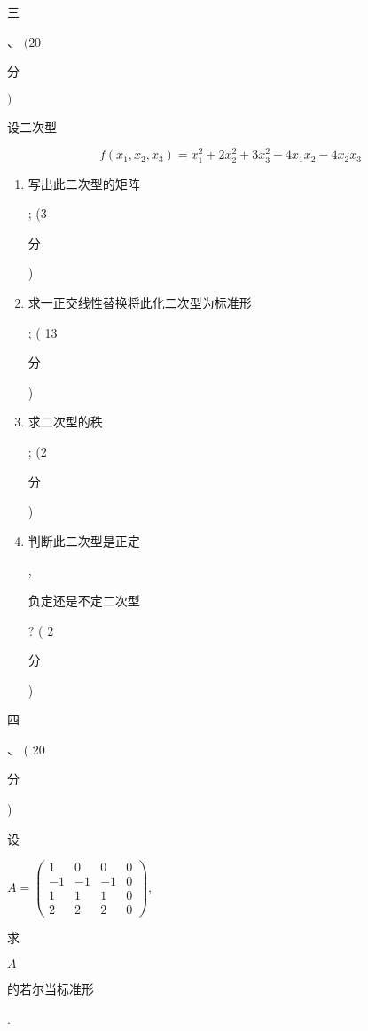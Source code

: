 \documentclass[10pt]{article}
\begin{document}
\begin{CJK}{UTF8}{mj}三\end{CJK}、 $(20$ \begin{CJK}{UTF8}{mj}分\end{CJK} $)$ \begin{CJK}{UTF8}{mj}设二次型\end{CJK}
$$
f\left(x_{1}, x_{2}, x_{3}\right)=x_{1}^{2}+2 x_{2}^{2}+3 x_{3}^{2}-4 x_{1} x_{2}-4 x_{2} x_{3}
$$

\begin{enumerate}
  \item \begin{CJK}{UTF8}{mj}写出此二次型的矩阵\end{CJK}; (3 \begin{CJK}{UTF8}{mj}分\end{CJK})

  \item \begin{CJK}{UTF8}{mj}求一正交线性替换将此化二次型为标准形\end{CJK}; ( 13 \begin{CJK}{UTF8}{mj}分\end{CJK})

  \item \begin{CJK}{UTF8}{mj}求二次型的秩\end{CJK}; (2 \begin{CJK}{UTF8}{mj}分\end{CJK})

  \item \begin{CJK}{UTF8}{mj}判断此二次型是正定\end{CJK}, \begin{CJK}{UTF8}{mj}负定还是不定二次型\end{CJK}? ( 2 \begin{CJK}{UTF8}{mj}分\end{CJK})

\end{enumerate}
\begin{CJK}{UTF8}{mj}四\end{CJK}、 ( 20 \begin{CJK}{UTF8}{mj}分\end{CJK}) \begin{CJK}{UTF8}{mj}设\end{CJK} $A=\left(\begin{array}{cccc}1 & 0 & 0 & 0 \\ -1 & -1 & -1 & 0 \\ 1 & 1 & 1 & 0 \\ 2 & 2 & 2 & 0\end{array}\right)$, \begin{CJK}{UTF8}{mj}求\end{CJK} $A$ \begin{CJK}{UTF8}{mj}的若尔当标准形\end{CJK}.
\end{document}
